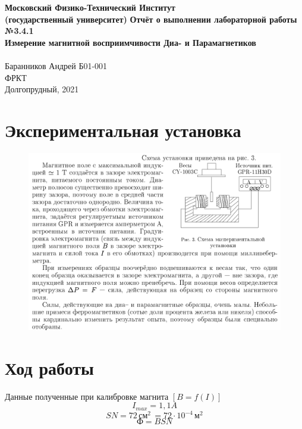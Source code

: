 \documentclass[a4paper, 12pt]{article}
\begin{document}
	\begin{titlepage}
		\begin{center}
			\large\textbf{Московский Физико-Технический Институт}\\
			\large\textbf{(государственный университет)}
			\vfill
			\huge\textbf{Отчёт о выполнении лабораторной работы №3.4.1\\ Измерение магнитной восприимчивости Диа- и Парамагнетиков}\\
			\ \\
			\large Баранников Андрей Б01-001\\
			\vfill
			\large ФРКТ\\
			\large Долгопрудный, 2021
		\end{center}
	\end{titlepage}
	
	\newpage
	\setcounter{page}{2}
	\fancyfoot[c]{\thepage}
	\fancyhead[R]{}
	
	\section*{Экспериментальная установка}
	\begin{figure}[h!]
		\centering
		\includegraphics[width = \textwidth]{Picture_1}
	\end{figure}
 	
 	\newpage
 	\section*{{Ход работы}}
 	Данные полученные при калибровке магнита $[B = f(I)]$ \\
 	\[
 	I_{max} = 1,1 A
 	\]
 	\[
 	SN = 72 \, см^2 \, = 72 \cdot 10^{-4} \, м^2
 	\]
 	\[
 	Ф = BSN
 	\]
 	
\end{document}
